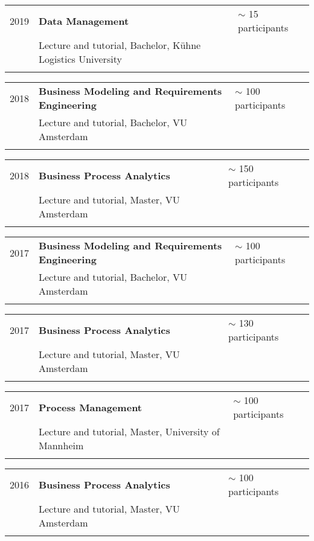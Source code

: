 \begin{tabular}{P{3cm}P{8cm}P{3cm}}		
2019		& \textbf{Data Management}				& $\sim$ 15 participants \\
				& Lecture and tutorial, Bachelor, Kühne Logistics University\\
				\\
\end{tabular}
\begin{tabular}{P{3cm}P{8cm}P{3cm}}		
2018		& \textbf{Business Modeling and Requirements Engineering}	& $\sim $ 100 participants \\
				& Lecture and tutorial, Bachelor, VU Amsterdam \\
				\\		
\end{tabular}
\begin{tabular}{P{3cm}P{8cm}P{3cm}}				
2018 		& \textbf{Business Process Analytics} & $\sim$ 150 participants \\
				& Lecture and tutorial, Master, VU Amsterdam \\
				\\				
\end{tabular}
\begin{tabular}{P{3cm}P{8cm}P{3cm}}		
2017		& \textbf{Business Modeling and Requirements Engineering}	& $\sim $ 100 participants \\
				& Lecture and tutorial, Bachelor, VU Amsterdam \\
				\\
\end{tabular}
\begin{tabular}{P{3cm}P{8cm}P{3cm}}		
2017		& \textbf{Business Process Analytics} 				& $\sim$ 130 participants \\
			 	& Lecture and tutorial, Master, VU Amsterdam \\
			 	\\
\end{tabular}
\begin{tabular}{P{3cm}P{8cm}P{3cm}}			
2017		& \textbf{Process Management}				& $\sim$ 100 participants \\
				& Lecture and tutorial, Master, University of Mannheim \\
					\\
\end{tabular}
\begin{tabular}{P{3cm}P{8cm}P{3cm}}		
2016		& \textbf{Business Process Analytics} 		&		$\sim$ 100 participants \\
				& Lecture and tutorial, Master, VU Amsterdam\\
				\\
\end{tabular}
